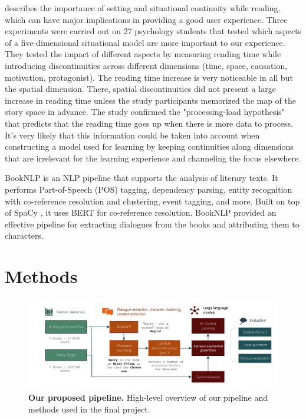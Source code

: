 \documentclass[fleqn,moreauthors,10pt]{ds_report}
\begin{document}
\cite{situation_models} describes the importance of setting and situational continuity while reading, which can have major implications in providing a good user experience.
Three experiments were carried out on 27 psychology students that tested which aspects of a five-dimensional situational model are more important to our experience.
They tested the impact of different aspects by measuring reading time while introducing discontinuities across different dimensions (time, space, causation, motivation, protagonist).
The reading time increase is very noticeable in all but the spatial dimension.
There, spatial discontinuities did not present a large increase in reading time unless the study participants memorized the map of the story space in advance.
The study confirmed the "processing-load hypothesis" that predicts that the reading time goes up when there is more data to process.
It's very likely that this information could be taken into account when constructing a model used for learning by keeping continuities along dimensions that are irrelevant for the learning experience and channeling the focus elsewhere.


BookNLP \cite{booknlp} is an NLP pipeline that supports the analysis of literary texts. It performs Part-of-Speech (POS) tagging, dependency parsing, entity recognition with co-reference resolution and clustering, event tagging, and more. Built on top of SpaCy \cite{spacy2}, it uses BERT \cite{joshi2019bert} for co-reference resolution. BookNLP provided an effective pipeline for extracting dialogues from the books and attributing them to characters.



\section*{Methods}

\begin{figure}[htp]
	\centering
	\includegraphics[width=\linewidth]{pipeline.pdf}
	\caption{\textbf{Our proposed pipeline.} High-level overview of our pipeline and methods used in the final project.}
	\label{fig:pipeline}
\end{figure}
\end{document}
